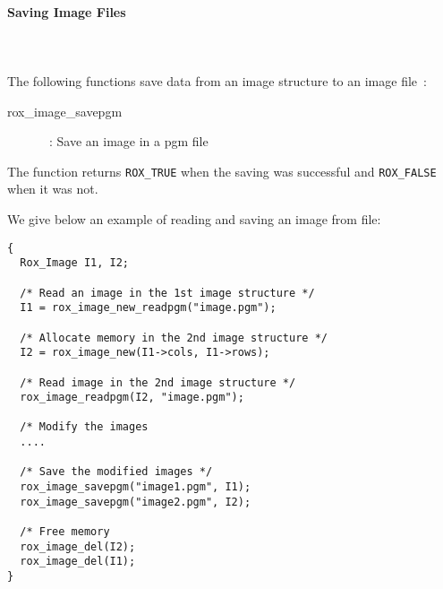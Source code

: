 \paragraph{Saving Image Files}
\label{sss:image_files-saving}
~\\~\\
The following functions save data from an image structure to an image file~:

\begin{description}
  \item [rox\_image\_savepgm]~: Save an image in a pgm file
\end{description}

The function returns {\tt ROX\_TRUE} when the saving was successful and {\tt ROX\_FALSE} when it was not. 




We give below an example of reading and saving an image from file:

\begin{lstlisting}
{
  Rox_Image I1, I2;

  /* Read an image in the 1st image structure */
  I1 = rox_image_new_readpgm("image.pgm");

  /* Allocate memory in the 2nd image structure */
  I2 = rox_image_new(I1->cols, I1->rows);

  /* Read image in the 2nd image structure */
  rox_image_readpgm(I2, "image.pgm");

  /* Modify the images
  ....

  /* Save the modified images */
  rox_image_savepgm("image1.pgm", I1);
  rox_image_savepgm("image2.pgm", I2);

  /* Free memory
  rox_image_del(I2);
  rox_image_del(I1);
}
\end{lstlisting}


